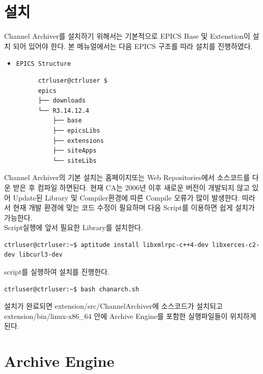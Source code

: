 \documentclass[11pt
  , a4paper
  , article
  , oneside
]{memoir}
\begin{document}
\chapter{설치}
Channel Archiver를 설치하기 위해서는 기본적으로 EPICS Base 및 Extenstion이 설치 되어 있어야 한다.
본 메뉴얼에서는 다음 EPICS 구조를 따라 설치를 진행하였다.
\begin{itemize}
  \item \texttt{EPICS Structure}
    {\scriptsize
     \begin{verbatim}
      ctrluser@ctrluser $
      epics
      ├── downloads
      └── R3.14.12.4
          ├── base
          ├── epicsLibs
          ├── extensions
          ├── siteApps
          └── siteLibs
     \end{verbatim}
     }
\end{itemize}
Channel Archiver의 기본 설치는 홈페이지\citep{CA_HOME}또는 Web Repositories\citep{CA_SF}에서
소스코드를 다운 받은 후 컴파일 하면된다. 현재 CA는 2006년 이후 새로운 버전이 개발되지
않고 있어 Update된 Library 및 Compiler환경에 따른 Compile 오류가 많이 발생한다. 
따라서 현재 개발 환경에 맞는 코드 수정이 필요하며 다음 Script를 이용하면 쉽게 설치가 가능한다.\\
Script실행에 앞서 필요한 Library를 설치한다.
\begin{lstlisting}[style=termstyle]
ctrluser@ctrluser:~$ aptitude install libxmlrpc-c++4-dev libxerces-c2-dev libcurl3-dev
\end{lstlisting}
script를 실행하여 설치를 진행한다.
\begin{lstlisting}[style=termstyle]
ctrluser@ctrluser:~$ bash chanarch.sh
\end{lstlisting}
설치가 완료되면 extension/src/ChannelArchiver에 소스코드가 설치되고 extension/bin/linux-x86\_64 안에 
Archive Engine를 포함한 실행파일들이 위치하게 된다.
\chapter{Archive Engine}
\end{document}
